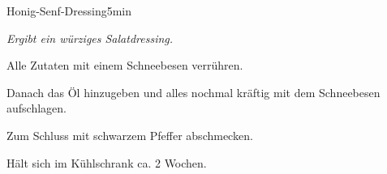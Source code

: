 \documentclass[../recipe-collections/cooking.tex]{subfiles}
\begin{document}
\begin{recipe}{Honig-Senf-Dressing}{}{5min }

  \freeform{}\textit{Ergibt ein würziges Salatdressing.}


  Alle Zutaten mit einem Schneebesen verrühren.


  Danach das Öl hinzugeben und alles nochmal kräftig mit dem Schneebesen aufschlagen.


  Zum Schluss mit schwarzem Pfeffer abschmecken.

  \freeform{}\hrulefill{}

  \freeform{}
  Hält sich im Kühlschrank ca. 2 Wochen.

\end{recipe}
\end{document}
